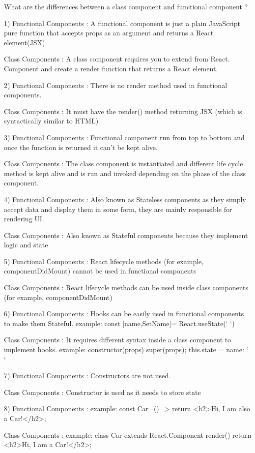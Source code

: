 What are the differences between a class component and functional component ?

1)
Functional Components : A functional component is just a plain JavaScript 
                        pure function that accepts props as an argument and 
                        returns a React element(JSX).

Class Components : A class component requires you to extend from React. 
                   Component and create a render function that returns a React element.

2)
Functional Components : There is no render method used in functional components.

Class Components : It must have the render() method returning JSX 
                   (which is syntactically similar to HTML)

3)
Functional Components : Functional component run from top to bottom and 
                        once the function is returned it can’t be kept alive.

Class Components : The class component is instantiated and different life cycle 
                   method is kept alive and is run and invoked depending on the 
                   phase of the class component.

4)
Functional Components : Also known as Stateless components as they simply 
                        accept data and display them in some form, 
                        they are mainly responsible for rendering UI.

Class Components : Also known as Stateful components because they 
                   implement logic and state

5)
Functional Components : React lifecycle methods (for example, componentDidMount) 
                        cannot be used in functional components

Class Components : React lifecycle methods can be used inside 
                   class components (for example, componentDidMount)

6)
Functional Components : Hooks can be easily used in functional 
                        components to make them Stateful.
                        example: const [name,SetName]= React.useState(‘ ‘)
                       

Class Components : It requires different syntax inside a class component to implement hooks.   
                   example: constructor(props) {
                         super(props);
                         this.state = {name: ‘ ‘}
                   }
                

7)
Functional Components : Constructors are not used.

Class Components : 	Constructor is used as it needs to store state

8)
Functional Components :  example: const Car=()=> {
                                       return <h2>Hi, I am also a Car!</h2>;
                                  }

Class Components : example: class Car extends React.Component {
                                    render() {
                                       return <h2>Hi, I am a Car!</h2>;
                                    }
                            }